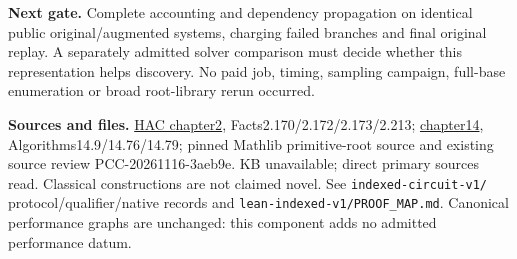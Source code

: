 \documentclass[10pt]{article}
\begin{document}
\textbf{Next gate.}
Complete accounting and dependency propagation on identical public
original/augmented systems, charging failed branches and final original
replay. A separately admitted solver comparison must decide whether this
representation helps discovery. No paid job, timing, sampling campaign,
full-base enumeration or broad root-library rerun occurred.

\textbf{Sources and files.}
\href{https://cacr.uwaterloo.ca/hac/about/chap2.pdf}{HAC chapter2},
Facts2.170/2.172/2.173/2.213;
\href{https://cacr.uwaterloo.ca/hac/about/chap14.pdf}{chapter14},
Algorithms14.9/14.76/14.79; pinned Mathlib primitive-root source and existing
source review PCC-20261116-3aeb9e. KB unavailable; direct primary sources read.
Classical constructions are not claimed novel.
See \texttt{indexed-circuit-v1/} protocol/qualifier/native records and
\texttt{lean-indexed-v1/PROOF\_MAP.md}. Canonical performance graphs are
unchanged: this component adds no admitted performance datum.
\end{document}
